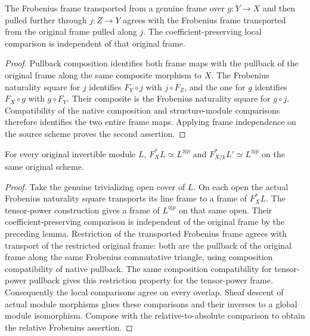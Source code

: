 \begin{lemma}
\label{lem:kn-frobenius-frame-restriction}
\leanok
{}
The Frobenius frame transported from a genuine frame over $g:Y\to X$
and then pulled further through $j:Z\to Y$ agrees with the Frobenius
frame transported from the original frame pulled along $j$.  The
coefficient-preserving local comparison is independent of that
original frame.
\end{lemma}
\begin{proof}
Pullback composition identifies both frame maps with the pullback of
the original frame along the same composite morphism to $X$.
The Frobenius naturality square for $j$ identifies $F_Y\circ j$
with $j\circ F_Z$, and the one for $g$ identifies $F_X\circ g$
with $g\circ F_Y$.  Their composite is the Frobenius naturality
square for $g\circ j$.  Compatibility of the native
composition and structure-module comparisons therefore identifies
the two entire frame maps.  Applying frame independence on the
source scheme proves the second assertion.
\end{proof}

\begin{theorem}
\label{thm:kn-frobenius-line-power}
\leanok
{}
For every original invertible module $L$,
$F_X^*L\simeq L^{\otimes p}$ and
$F_{X/k}^*L'\simeq L^{\otimes p}$ on the same original scheme.
\end{theorem}
\begin{proof}
Take the genuine trivializing open cover of $L$.  On each open the
actual Frobenius naturality square transports its line frame to a
frame of $F_X^*L$.  The tensor-power construction gives a frame of
$L^{\otimes p}$ on that same open.  Their coefficient-preserving
comparison is independent of the original frame by the preceding
lemma.  Restriction of the transported Frobenius frame agrees with
transport of the restricted original frame: both are the pullback of
the original frame along the same Frobenius commutative triangle,
using composition compatibility of native pullback.  The same
composition compatibility for tensor-power pullback gives this
restriction property for the tensor-power frame.  Consequently the
local comparisons agree on every overlap.  Sheaf descent of actual
module morphisms glues these comparisons and their inverses to a
global module isomorphism.  Compose with the relative-to-absolute
comparison to obtain the relative Frobenius assertion.
\end{proof}


